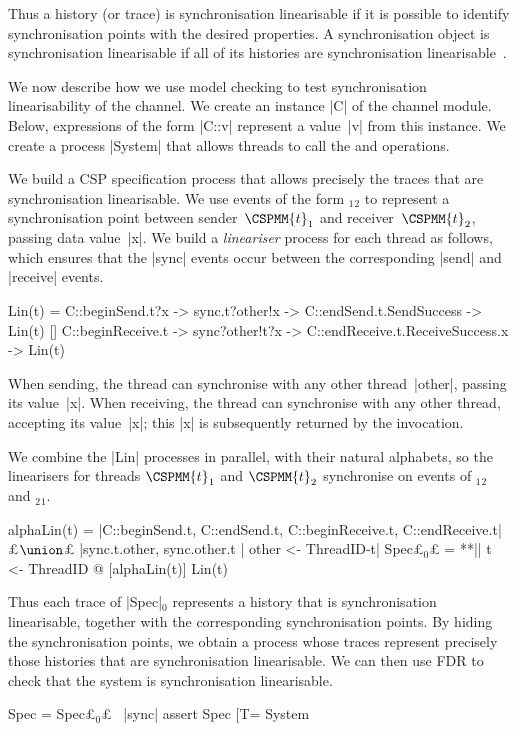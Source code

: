 Thus a history (or trace) is synchronisation linearisable if it is possible to
identify synchronisation points with the desired properties.  A
synchronisation object is synchronisation linearisable if all of its histories
are synchronisation linearisable~\cite{LL:synchronisation}.


\inlineCSP

We now describe how we use model checking to test synchronisation
linearisability of the channel. 
We create an instance |C| of the channel module.  Below, expressions of the
form |C::v| represent a value~|v| from this instance.  We create a process
|System| that allows threads to call the  and 
operations.

We build a CSP specification process that allows precisely the traces that are
synchronisation linearisable.  We use events of the form
$_1$$_2$ to represent a synchronisation point
between sender~$\CSPMM{t}_1$ and receiver~$\CSPMM{t}_2$, passing data
value~|x|.  We build a \emph{lineariser} process for each thread as follows,
which ensures that the |sync| events occur between the corresponding |send|
and |receive| events.
%
\begin{cspm}
Lin(t) = 
  C::beginSend.t?x -> sync.t?other!x -> C::endSend.t.SendSuccess -> Lin(t)
  []
  C::beginReceive.t -> sync?other!t?x -> C::endReceive.t.ReceiveSuccess.x -> Lin(t)
\end{cspm}
%
When sending, the thread can synchronise with any other thread~|other|,
passing its value~|x|.  When receiving, the thread can synchronise with any
other thread, accepting its value~|x|; this |x| is subsequently returned by
the invocation.

We combine the |Lin| processes in parallel, with their natural
alphabets, so the linearisers for threads $\CSPMM{t}_1$ and $\CSPMM{t}_2$
synchronise on events of $_1$$_2$ and
$_2$$_1$.  
%
\begin{cspm}
alphaLin(t) =
  {|C::beginSend.t, C::endSend.t, C::beginReceive.t, C::endReceive.t|} £$\union$£
  {|sync.t.other, sync.other.t | other <- ThreadID-{t}|}
Spec£$_0$£ = **|| t <- ThreadID @ [alphaLin(t)] Lin(t)
\end{cspm} %
%
Thus each trace of |Spec|$_0$ represents a history that is synchronisation
linearisable, together with the corresponding synchronisation points.  By
hiding the synchronisation points, we obtain a process whose traces represent
precisely those histories that are synchronisation linearisable.  We can then
use FDR to check that the system is synchronisation linearisable. 
%
\begin{cspm}
Spec = Spec£$_0$£ \ {|sync|}
assert Spec [T= System
\end{cspm}

